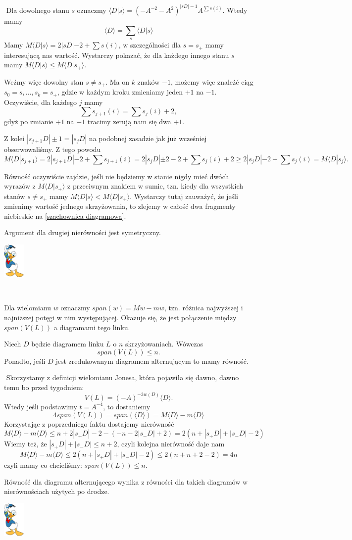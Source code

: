 \documentclass{article}
\renewenvironment{proof}{{\bfseries\color{orange} Dowód}$ $\newline}{
  \begin{flushright}\includegraphics[width=30pt]{Donald_Duck.png}\end{flushright}$ $\newline
}
\begin{document}
\begin{proof}
  Dla dowolnego stanu $s$ oznaczmy $\langle D|s\rangle=(-A^{-2}-A^2)^{|sD|-1}A^{\sum s(i)}$. Wtedy mamy 
  $$\langle D\rangle = \sum_s \langle D|s\rangle$$
  Mamy $M\langle D|s\rangle=2|sD|-2+\sum s(i)$, w szczególności dla $s=s_+$ mamy interesującą nas wartość. Wystarczy pokazać, że dla każdego innego stanu $s$ mamy $M\langle D|s\rangle \leq M\langle D|s_+\rangle$.

  Weźmy więc dowolny stan $s\neq s_+$. Ma on $k$ znaków $-1$, możemy więc znaleźć ciąg $s_0=s,...,s_k=s_+$, gdzie w każdym kroku zmieniamy jeden $+1$ na $-1$. Oczywiście, dla każdego $j$ mamy 
  $$\sum s_{j+1}(i)=\sum s_j(i)+2,$$
  gdyż po zmianie $+1$ na $-1$ tracimy zerują nam się dwa $+1$.

  Z kolei $|s_{j+1}D|\pm 1=|s_jD|$ na podobnej zasadzie jak już wcześniej obserwowaliśmy. Z tego powodu 
  $$M\langle D|s_{j+1}\rangle =2|s_{j+1}D|-2+\sum s_{j+1}(i)=2|s_jD|\pm 2-2+\sum s_j(i)+2\geq 2|s_jD|-2+\sum s_j(i)=M\langle D|s_j\rangle.$$

  Równość oczywiście zajdzie, jeśli nie będziemy w stanie nigdy mieć dwóch wyrazów z $M\langle D|s_+\rangle$ z przeciwnym znakiem w sumie, tzn. kiedy dla wszystkich stanów $s\neq s_+$ mamy $M\langle D|s\rangle < M\langle D|s_+\rangle$. Wystarczy tutaj zauważyć, że jeśli zmienimy wartość jednego skrzyżowania, to zlejemy w całość dwa fragmenty niebieskie na \cref{szachownica diagramowa}.

  Argument dla drugiej nierówności jest symetryczny.
\end{proof}


Dla wielomianu $w$ oznaczmy $span(w)=Mw-mw$, tzn. różnica najwyższej i najniższej potęgi w nim występującej. Okazuje się, że jest połączenie między $span(V(L))$ a diagramami tego linku.

\begin{thm}
  Niech $D$ będzie diagramem linku $L$ o $n$ skrzyżowaniach. Wówczas
  $$span(V(L))\leq n.$$
  Ponadto, jeśli $D$ jest zredukowanym diagramem alternującym to mamy równość.
\end{thm}

\begin{proof}
  Skorzystamy z definicji wielomianu Jonesa, która pojawiła się dawno, dawno temu bo przed tygodniem:
  $$V(L)=(-A)^{-3w(D)}\langle D\rangle.$$
  Wtedy jeśli podstawimy $t=A^{-4}$, to dostaniemy
  $$4span(V(L))=span(\langle D\rangle)=M\langle D\rangle-m\langle D\rangle$$
  Korzystając z poprzedniego faktu dostajemy nierówność
  $$M\langle D\rangle -m\langle D\rangle\leq n+2|s_+D|-2-(-n-2|s_-D|+2)=2(n+|s_+D|+|s_-D|-2)$$
  Wiemy też, że $|s_+D|+|s_-D|\leq n+2$, czyli kolejna nierówność daje nam 
  $$M\langle D\rangle -m\langle D\rangle \leq 2(n+|s_+D|+|s_-D|-2)\leq 2(n+n+2-2)=4n$$
  czyli mamy co chcieliśmy: $span(V(L))\leq n$.

  Równość dla diagramu alternującego wynika z równości dla takich diagramów w nierównościach użytych po drodze.
\end{proof}
\end{document}
